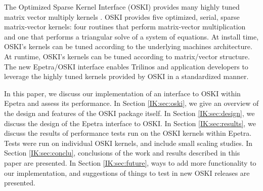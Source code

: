 The Optimized Sparse Kernel Interface (OSKI)
provides many highly tuned matrix vector multiply kernels \cite{IK:OSKI-paper,IK:OSKI-site,IK:OSKI-user}.  OSKI
provides five optimized, serial, sparse matrix-vector kernels: four routines that perform matrix-vector multiplication and
one that performs a triangular solve of a system of equations.
At install time, OSKI's kernels can be tuned according to the underlying machines architecture.
At runtime, OSKI's kernels can be tuned according to matrix/vector structure.
The new Epetra/OSKI interface
enables Trilinos and application developers to leverage the highly tuned kernels
provided by OSKI in a standardized manner.

In this paper, we discuss our implementation of an interface to OSKI within Epetra and assess its performance.
In Section \ref{IK:sec:oski}, we give an overview of the design and features of the OSKI
package itself.  In Section \ref{IK:sec:design}, we discuss the design of the Epetra interface to OSKI.
In Section \ref{IK:sec:results}, we discuss the results of performance tests
run on the OSKI kernels within Epetra.  Tests were run on individual OSKI kernels, and
include small scaling studies.  In Section \ref{IK:sec:conclu}, conclusions of the work and results
described in this paper are presented.  In Section \ref{IK:sec:future}, ways to add more functionality to our
implementation, and suggestions of things to test in new OSKI releases are presented.
